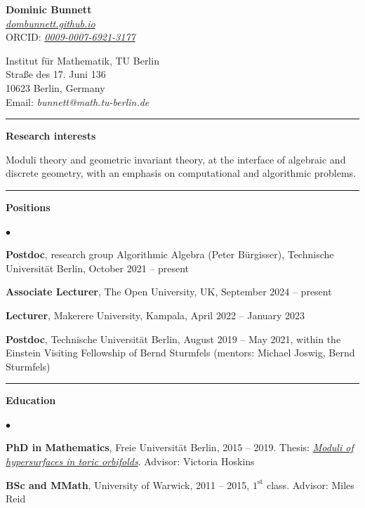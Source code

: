 \documentclass[10pt]{article}
\newcommand{\cvsection}[1]{%
  \par\vspace{0.24cm}%
  \noindent\rule{\textwidth}{0.4pt}%
  \par\vspace{0.10cm}%
  \noindent\textbf{\large #1}%
  \par\vspace{0.10cm}%
}
\newenvironment{cvlist}%
  {\begin{list}{$\bullet$}{%
     \setlength{\leftmargin}{1.1em}\setlength{\labelwidth}{0.8em}%
     \setlength{\itemsep}{0.10cm}\setlength{\parsep}{0pt}%
     \setlength{\topsep}{0pt}\setlength{\partopsep}{0pt}}}%
  {\end{list}}
\begin{document}
\begin{minipage}[t]{0.48\textwidth}
\vspace{0pt}
{\Large\textbf{Dominic Bunnett}}\\[0.26cm]
\href{https://dombunnett.github.io}{\em dombunnett.github.io}\\
ORCID: \href{https://orcid.org/0009-0007-6921-3177}{\em 0009-0007-6921-3177}
\end{minipage}\hfill
\begin{minipage}[t]{0.48\textwidth}
\vspace{0pt}
Institut f\"ur Mathematik, TU Berlin\\
Stra\ss{}e des 17. Juni 136\\
10623 Berlin, Germany\\
Email: {\em bunnett@math.tu-berlin.de}
\end{minipage}

\vspace{0.3cm}

\cvsection{Research interests}
Moduli theory and geometric invariant theory, at the interface of algebraic and
discrete geometry, with an emphasis on computational and algorithmic problems.

\cvsection{Positions}
\begin{cvlist}
\item {\bf Postdoc}, research group Algorithmic Algebra (Peter B\"urgisser),
Technische Universit\"at Berlin, October 2021 -- present
\item {\bf Associate Lecturer}, The Open University, UK, September 2024 -- present
\item {\bf Lecturer}, Makerere University, Kampala, April 2022 -- January 2023
\item {\bf Postdoc}, Technische Universit\"at Berlin, August 2019 -- May 2021,
within the Einstein Visiting Fellowship of Bernd Sturmfels
(mentors: Michael Joswig, Bernd Sturmfels)
\end{cvlist}

\cvsection{Education}
\begin{cvlist}
\item {\bf PhD in Mathematics}, Freie Universit\"at Berlin, 2015 -- 2019.
Thesis: \href{https://refubium.fu-berlin.de/handle/fub188/27333}{\em Moduli of hypersurfaces in toric orbifolds}.
Advisor: Victoria Hoskins
\item {\bf BSc and MMath}, University of Warwick, 2011 -- 2015, $1^{\text{st}}$ class.
Advisor: Miles Reid
\end{cvlist}
\end{document}
